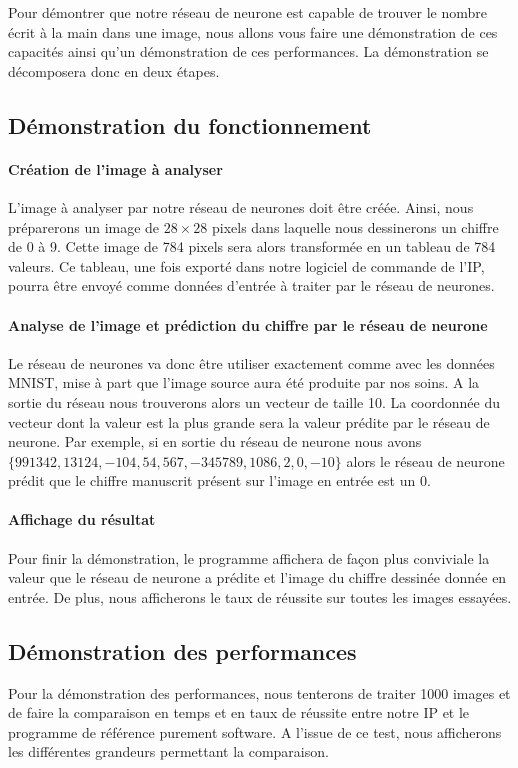 Pour démontrer que notre réseau de neurone est capable de trouver le nombre écrit à la main 
dans une image, nous allons vous faire une démonstration de ces capacités ainsi qu'un démonstration de ces performances. 
La démonstration se décomposera donc en deux étapes.

\subsection{Démonstration du fonctionnement}

\paragraph{Création de l'image à analyser\\}
	L'image à analyser par notre réseau de neurones doit être créée. Ainsi, nous préparerons 
	un image de $28 \times 28$ pixels dans laquelle nous dessinerons un chiffre de 0 à 9. 
	Cette image de 784 pixels sera alors transformée en un tableau de 784 valeurs. 
	Ce tableau, une fois exporté dans notre logiciel de commande de l'IP, 
	pourra être envoyé comme données d'entrée à traiter par le réseau de neurones.
	
\paragraph{Analyse de l'image et prédiction du chiffre par le réseau de neurone\\}
	Le réseau de neurones va donc être utiliser exactement comme avec les données MNIST, 
	mise à part que l'image source aura été produite par nos soins. A la sortie du réseau 
	nous trouverons alors un vecteur de taille 10. La coordonnée du vecteur dont la 
	valeur est la plus grande sera la valeur prédite par le réseau de neurone. 
	Par exemple, si en sortie du réseau de neurone nous avons $\{991342, 13124, -104, 54, 567, -345789, 1086, 2, 0, -10\}$ 
	alors le réseau de neurone prédit que le chiffre manuscrit présent sur l'image en entrée est un 0.
	
\paragraph{Affichage du résultat\\}
	Pour finir la démonstration, le programme affichera de façon plus conviviale 
	la valeur que le réseau de neurone a prédite et l'image du chiffre dessinée donnée en entrée. 
	De plus, nous afficherons le taux de réussite sur toutes les images essayées.
	
\subsection{Démonstration des performances}
	Pour la démonstration des performances, nous tenterons de traiter 1000 images 
	et de faire la comparaison en temps et en taux de réussite entre notre IP 
	et le programme de référence purement software. A l'issue de ce test, nous afficherons les 
	différentes grandeurs permettant la comparaison.